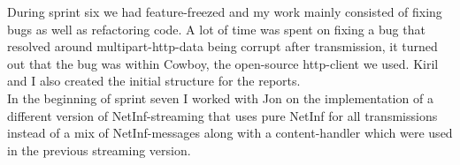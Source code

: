 During sprint six we had feature-freezed and my work mainly consisted of fixing bugs as well as refactoring code. A lot of time was spent on fixing a bug that resolved around multipart-http-data being corrupt after transmission, it turned out that the bug was within Cowboy, the open-source http-client we used. Kiril and I also created the initial structure for the reports. \\

In the beginning of sprint seven I worked with Jon on the implementation of a different version of NetInf-streaming that uses pure NetInf for all transmissions instead of a mix of NetInf-messages along with a content-handler which were used in the previous streaming version. 


